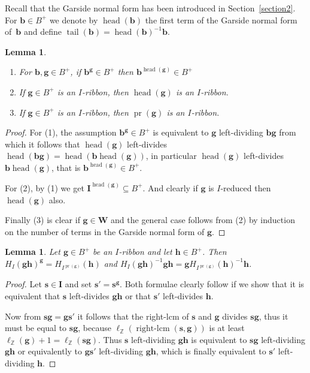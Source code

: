 \documentclass{amsart}
\numberwithin{equation}{section}
\newtheorem{lemma}[equation]{Lemma}
\newcommand\lZ{{\ell_{\BZ}}}
\newcommand\inv{^{-1}}
\newcommand\bb{{\mathbf b}}
\newcommand\bg{{\mathbf g}}
\newcommand\bh{{\mathbf h}}
\newcommand\bs{{\mathbf s}}
\newcommand\bI{{\mathbf I}}
\newcommand\bW{{\mathbf W}}
\newcommand\BZ{{\mathbb Z}}
\DeclareMathOperator\rightlcm{right-lcm}
\DeclareMathOperator\pr{pr}
\DeclareMathOperator\head{head}
\DeclareMathOperator\tail{tail}
\begin{document}
Recall that the Garside normal form has been introduced in Section~\ref{section2}. For  $\bb\in B^+$  we denote by $\head(\bb)$ \index{head@$\head$} the first term of the
Garside   normal   form   of~$\bb$   and  define
$\tail(\bb)=\head(\bb)\inv\bb$.
\index{tail@$\tail$}
\begin{lemma}\label{divers}\phantom{a}
\begin{enumerate}
\item For $\bb,\bg\in B^+$, if $\bb^\bg\in B^+$ then $\bb^{\head(\bg)}\in B^+$
\item If $\bg\in B^+$ is an $I$-ribbon, then $\head(\bg)$ is an $I$-ribbon.
\item If $\bg\in B^+$ is an $I$-ribbon, then $\pr(\bg)$ is an $I$-ribbon.
\end{enumerate}
\end{lemma}
\begin{proof}
For  (1), the assumption  $\bb^\bg\in B^+$ is equivalent to $\bg$
left-dividing
$\bb\bg$  from  which  it  follows  that $\head(\bg)$ left-divides
$\head(\bb\bg)=\head(\bb
\head(\bg))$,   in   particular   $\head(\bg)$ left-divides $   \bb  \head(\bg)$,  that  is
$\bb^{\head(\bg)}\in B^+$.

 For (2), by (1) we get $\bI^{\head(\bg)}\subseteq B^+$. And clearly if $\bg$ is
 $I$-reduced then $\head(\bg)$ also.

Finally  (3)  is  clear if  $\bg\in\bW$  and  the  general case follows from
(2) by induction on the number of terms in the Garside normal form of $\bg$.
\end{proof}
\begin{lemma}\label{$I$-head and $I$-tail preserved by ribbons}
Let $\bg\in B^+$ be an $I$-ribbon and
let $\bh\in B^+$. Then $H_I(\bg\bh)^\bg=H_{I^{\pr(\bg)}}(\bh)$
and $H_I(\bg\bh)\inv\bg\bh=\bg H_{I^{\pr(\bg)}}(\bh)\inv\bh$.
\end{lemma}
\begin{proof} Let $\bs\in \bI$ and set $\bs'=\bs^\bg$. Both formulae clearly
follow if we show that it is equivalent that $\bs$ left-divides $ \bg\bh$ or that
$\bs'$ left-divides $ \bh$.

Now from $\bs \bg= \bg\bs'$ it follows that the right-lcm of $\bs$ and $\bg$
divides $\bs \bg$, thus it must be equal to $\bs \bg$, because 
$\lZ(\rightlcm(\bs,\bg))$ is
at least $\lZ(\bg)+1=\lZ(\bs\bg)$.
Thus $\bs$ left-dividing $ \bg\bh$ is equivalent to $\bs
\bg$ left-dividing $ \bg\bh$ or equivalently to $\bg\bs'$ left-dividing $ \bg\bh$, 
which is finally equivalent to $\bs'$ left-dividing $ \bh$.
\end{proof}
\end{document}
